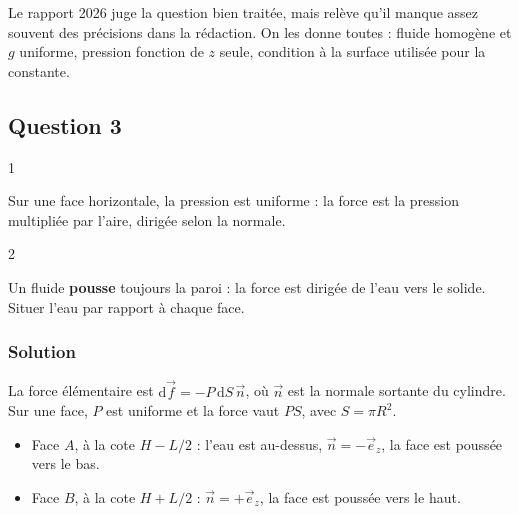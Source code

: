 \documentclass[11pt,a4paper]{article}
\providecommand{\tightlist}{\setlength{\itemsep}{0pt}\setlength{\parskip}{0pt}}
\newcommand{\equationajustee}[1]{%
  \sbox{\boiteequation}{$\displaystyle #1$}%
  \ifdim\wd\boiteequation>\linewidth
    \[\resizebox{\linewidth}{!}{\usebox{\boiteequation}}\]%
  \else
    \[#1\]%
  \fi}
\begin{document}
\begin{jury}

Le rapport 2026 juge la question bien traitée, mais relève qu'il manque assez souvent des précisions dans la rédaction. On les donne toutes : fluide homogène et \(g\) uniforme, pression fonction de \(z\) seule, condition à la surface utilisée pour la constante.

\end{jury}

\hypertarget{question-3}{%
\subsection{Question 3}\label{question-3}}

\begin{indication}{1}

Sur une face horizontale, la pression est uniforme : la force est la pression multipliée par l'aire, dirigée selon la normale.

\end{indication}

\begin{indication}{2}

Un fluide \textbf{pousse} toujours la paroi : la force est dirigée de l'eau vers le solide. Situer l'eau par rapport à chaque face.

\end{indication}

\hypertarget{solution-2}{%
\subsubsection{Solution}\label{solution-2}}

La force élémentaire est \(\mathrm{d}\vec f = -P\,\mathrm{d}S\,\vec n\), où \(\vec n\) est la normale sortante du cylindre. Sur une face, \(P\) est uniforme et la force vaut \(P S\), avec \(S = \pi R^2\).

\begin{itemize}
\tightlist
\item
  Face \(A\), à la cote \(H - L/2\) : l'eau est au-dessus, \(\vec n = -\vec e_z\), la face est poussée vers le bas.
\item
  Face \(B\), à la cote \(H + L/2\) : \(\vec n = +\vec e_z\), la face est poussée vers le haut.
\end{itemize}

\equationajustee{\boxed{\vec f_A = \Big[P_0 + \mu g\big(H - \tfrac{L}{2}\big)\Big]\pi R^2\,\vec e_z}}
\end{document}
